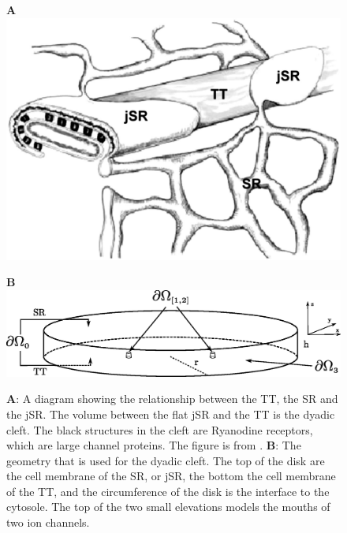\begin{figure}[t]
  \centering
  \begin{minipage}{0.27\linewidth}
     \large \textbf{A}\\
    \includegraphics[width=\smallwidth]{chapters/hake/eps/SR_TT.eps}
  \end{minipage}
  \begin{minipage}{0.72\linewidth}
     \large \textbf{B}\\
    \includegraphics[width=\smallwidth]{chapters/hake/eps/disk.eps}
  \end{minipage}
  \caption{\textbf{A}: A diagram showing the relationship between the TT, the SR and the jSR. The volume between the flat jSR and the TT is the dyadic cleft. The black structures in the cleft are Ryanodine receptors, which are large channel proteins. The figure is from \cite{Broc_2005_3099}. \textbf{B}: The geometry that is used for the dyadic cleft. The top of the disk are the cell membrane of the SR, or jSR, the bottom the cell membrane of the TT, and the circumference of the disk is the interface to the cytosole. The top of the two small elevations models the mouths of two ion channels.}
\label{fig:morphology}
\end{figure}

